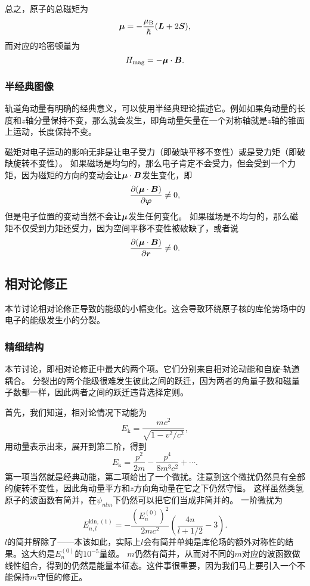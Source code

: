 总之，原子的总磁矩为
\begin{equation}
    {\vb*{\mu}} = - \frac{\mu_\text{B}}{\hbar} (\vb*{L} + 2\vb*{S}),
\end{equation}
而对应的哈密顿量为
\begin{equation}
    {H}_\text{mag} = - {\vb*{\mu}} \cdot \vb*{B}.
    \label{eq:magnetic-hamiltonian}
\end{equation}

\subsubsection{半经典图像}

轨道角动量有明确的经典意义，可以使用半经典理论描述它。例如如果角动量的长度和$z$轴分量保持不变，那么就会发生，即角动量矢量在一个对称轴就是$z$轴的锥面上运动，长度保持不变。

磁矩对电子运动的影响无非是让电子受力（即破缺平移不变性）或是受力矩（即破缺旋转不变性）。
如果磁场是均匀的，那么电子肯定不会受力，但会受到一个力矩，因为磁矩的方向的变动会让$\vb*{\mu} \cdot \vb*{B}$发生变化，即
\[
    \pdv{(\vb*{\mu} \cdot \vb*{B})}{\vb*{\varphi}} \neq 0,
\]
但是电子位置的变动当然不会让$\vb*{\mu}$发生任何变化。
如果磁场是不均匀的，那么磁矩不仅受到力矩还受力，因为空间平移不变性被破缺了，或者说
\[
    \pdv{(\vb*{\mu} \cdot \vb*{B})}{\vb*{r}} \neq 0.
\]

\subsection{相对论修正}

本节讨论相对论修正导致的能级的小幅变化。这会导致环绕原子核的库伦势场中的电子的能级发生小的分裂。

\subsubsection{精细结构}

本节讨论，即相对论修正中最大的两个项。它们分别来自相对论动能和自旋-轨道耦合。
分裂出的两个能级很难发生彼此之间的跃迁，因为两者的角量子数和磁量子数都一样，因此两者之间的跃迁违背选择定则。

首先，我们知道，相对论情况下动能为
\[
    E_\text{k} = \frac{m c^2}{\sqrt{1 - v^2 / c^2}},
\]
用动量表示出来，展开到第二阶，得到
\begin{equation}
    E_\text{k} = \frac{p^2}{2m} - \frac{p^4}{8 m^3 c^2} + \cdots.
\end{equation}
第一项当然就是经典动能，第二项给出了一个微扰。注意到这个微扰仍然具有全部的旋转不变性，因此角动量平方和$z$方向角动量在它之下仍然守恒。
这样虽然类氢原子的波函数有简并，在$\psi_{nlm}$下仍然可以把它们当成非简并的。
一阶微扰为
\begin{equation}
    E^{\text{kin},(1)}_{n, l} = - \frac{(E^{(0)}_n)^2}{2 m c^2} \left( \frac{4 n}{l + 1/2} - 3 \right).
    \label{eq:kinetic-energy-relativity-correction}
\end{equation}
$l$的简并解除了——本该如此，实际上$l$会有简并单纯是库伦场的额外对称性的结果。这大约是$E_n^{(0)}$的$10^{-5}$量级。
$m$仍然有简并，从而对不同的$m$对应的波函数做线性组合，得到的仍然是能量本征态。这件事很重要，因为我们马上要引入一个不能保持$m$守恒的修正。

